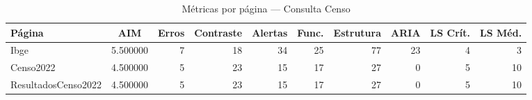 \begin{table}[htbp]
  \centering
  \caption{Métricas por página — Consulta Censo}
  \label{tab:flow_consulta_censo}
  \small
  \begin{tabular}{lcrrrrrrrr}
\toprule
Página & AIM & Erros & Contraste & Alertas & Func. & Estrutura & ARIA & LS Crít. & LS Méd. \\
\midrule
Ibge & 5.500000 & 7 & 18 & 34 & 25 & 77 & 23 & 4 & 3 \\
Censo2022 & 4.500000 & 5 & 23 & 15 & 17 & 27 & 0 & 5 & 10 \\
ResultadosCenso2022 & 4.500000 & 5 & 23 & 15 & 17 & 27 & 0 & 5 & 10 \\
\bottomrule
\end{tabular}
\end{table}
